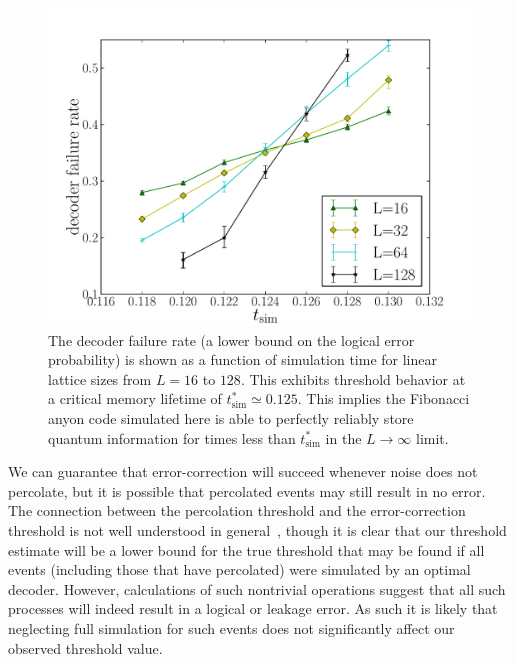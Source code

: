 \documentclass[aps, prl, letterpaper, twocolumn, superscriptaddress, notitlepage, 10pt]{revtex4-1}
\begin{document}
\begin{figure}[t!]
\begin{center}
	\includegraphics[width=\columnwidth]{anyons-kyle.pdf}
\caption{The decoder failure rate (a lower bound on the logical error probability) is shown as a function of simulation time for linear lattice sizes from $L=16$ to $128$. 
This exhibits threshold behavior at a critical memory lifetime of $t_{\mathrm{sim}}^*\simeq 0.125$. 
This implies the Fibonacci anyon code simulated here is able to perfectly reliably store quantum information for times less than $t_{\mathrm{sim}}^*$ in the $L\to \infty$ limit.}
\label{f:threshold}
\end{center}
\end{figure}

We can guarantee that error-correction will succeed whenever noise does not percolate, but it is possible that percolated events may still result in no error. 
The connection between the percolation threshold and the error-correction threshold is not well understood in general~\cite{Hastings2014}, though it is clear that our threshold estimate will be a lower bound for the true threshold that may be found if all events (including those that have percolated) were simulated by an optimal decoder. 
However, calculations of such nontrivial operations suggest that all such processes will indeed result in a logical or leakage error.
As such it is likely that neglecting full simulation for such events does not significantly affect our observed threshold value.

\end{document}
